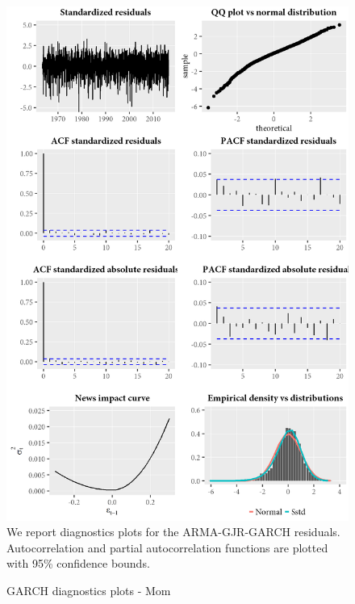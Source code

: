 \begin{figure}[H]
  \caption{GARCH diagnostics plots - Mom}
  \label{diag:garchdiagMom}
  \toprule
  \centering
  \begin{minipage}{\textwidth}
  \includegraphics[scale=1]{graphics/garch/garch_diagnosticsMom.png}  
  \bottomrule
  \vspace{3mm}
  \footnotesize
  We report diagnostics plots for the ARMA-GJR-GARCH residuals. Autocorrelation and partial autocorrelation functions are plotted with 95\% confidence bounds.
  \end{minipage}
\end{figure}

